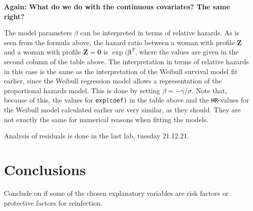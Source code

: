 \documentclass[
]{article}
\begin{document}
\textbf{Again: What do we do with the continuous covariates? The same right?}

The model parameters \(\beta\) can be interpreted in terms of relative hazards. As is seen from the formula above, the hazard ratio between a woman with profile \(\mathbf{Z}\) and a woman with profile \(\mathbf{Z} = \mathbf{0}\) is \(\exp(\mathbf{\beta}^T\), where the values are given in the second column of the table above. The interpretation in terms of relative hazards in this case is the same as the interpretation of the Weibull survival model fit earlier, since the Weibull regression model allows a representation of the proportional hazards model. This is done by setting \(\beta = -\gamma/\sigma\). Note that, because of this, the values for \texttt{exp(coef)} in the table above and the \texttt{HR}-values for the Weibull model calculated earlier are very similar, as they should. They are not exactly the same for numerical reasons when fitting the models.

Analysis of residuals is done in the last lab, tuesday 21.12.21.

\hypertarget{conclusions}{%
\section{Conclusions}\label{conclusions}}

Conclude on if some of the chosen explanatory variables are risk factors or protective factors for reinfection.
\end{document}
